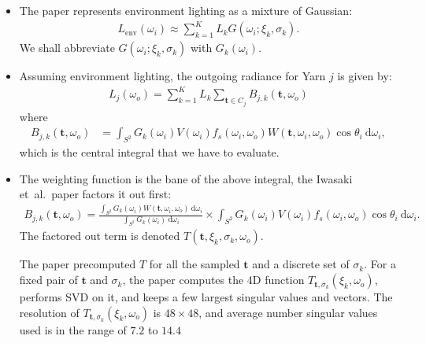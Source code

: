 \documentclass[10pt]{article}
\newcommand{\dee}{\mathrm{d}}
\newcommand{\ve}[1]{\mathbf{#1}}
\newcommand{\etal}{{et~al.}}
\begin{document}
  \begin{itemize}
    \item The paper represents environment lighting as a mixture of Gaussian:
    \begin{align*}
      L_{\mathrm{env}}(\omega_i) \approx \sum_{k=1}^K L_k G(\omega_i; \xi_k, \sigma_k).
    \end{align*}
    We shall abbreviate $G(\omega_i; \xi_k, \sigma_k)$ with $G_k(\omega_i)$.

    \item Assuming environment lighting, the outgoing radiance for Yarn $j$ is given by:
    \begin{align*}
      L_j(\omega_o) = \sum_{k=1}^K L_k \sum_{\ve{t} \in C_j} B_{j,k}(\ve{t}, \omega_o)
    \end{align*}
    where
    \begin{align*}
      B_{j,k}(\ve{t}, \omega_o)
      &= \int_{S^2} G_k(\omega_i) V(\omega_i) f_s(\omega_i, \omega_o) W(\ve{t},\omega_i,\omega_o)\cos\theta_i\ \dee\omega_i,
    \end{align*}
    which is the central integral that we have to evaluate.

    \item The weighting function is the bane of the above integral, the Iwasaki \etal\ paper factors it out first:
    \begin{align*}
      B_{j,k}(\ve{t},\omega_o) 
      = \frac{\int_{S^2} G_k(\omega_i)W(\ve{t}, \omega_i,\omega_o)\ \dee\omega_i}{\int_{S^2} G_k(\omega_i)\ \dee\omega_i}
      \times \int_{S^2} G_k(\omega_i) V(\omega_i) f_s(\omega_i, \omega_o)\cos\theta_i\ \dee\omega_i.
    \end{align*}
    The factored out term is denoted $T(\ve{t}, \xi_k, \sigma_k, \omega_o)$.  

    The paper precomputed $T$ for all the sampled $\ve{t}$ and a discrete set of $\sigma_k$.  For a fixed pair of $\ve{t}$ and $\sigma_k$, the paper computes the 4D function $T_{\ve{t},\sigma_k}(\xi_k, \omega_o)$, performs SVD on it, and keeps a few largest singular values and vectors.  The resolution of $T_{\ve{t},\sigma_k}(\xi_k, \omega_o)$ is $48 \times 48$, and average number singular values used is in the range of $7.2$ to $14.4$


\end{itemize}
\end{document}
